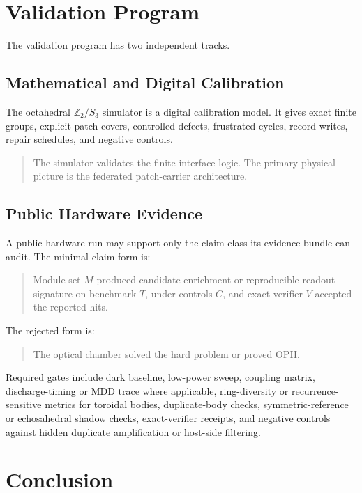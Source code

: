 \documentclass[11pt]{article}
\theoremstyle{remark}
\theoremstyle{plain}
\begin{document}
\section{Validation Program}

The validation program has two independent tracks.

\subsection{Mathematical and Digital Calibration}

The octahedral \(\mathbb Z_2/S_3\) simulator is a digital calibration model. It gives exact
finite groups, explicit patch covers, controlled defects, frustrated cycles, record writes,
repair schedules, and negative controls.
\begin{quote}
The simulator validates the finite interface logic. The primary physical picture is the
federated patch-carrier architecture.
\end{quote}

\subsection{Public Hardware Evidence}

A public hardware run may support only the claim class its evidence bundle can audit. The minimal
claim form is:
\begin{quote}
Module set \(M\) produced candidate enrichment or reproducible readout signature on benchmark
\(T\), under controls \(C\), and exact verifier \(V\) accepted the reported hits.
\end{quote}

The rejected form is:
\begin{quote}
The optical chamber solved the hard problem or proved OPH.
\end{quote}

Required gates include dark baseline, low-power sweep, coupling matrix, discharge-timing or MDD
trace where applicable, ring-diversity or recurrence-sensitive metrics for toroidal bodies,
duplicate-body checks, symmetric-reference or echosahedral shadow checks, exact-verifier receipts,
and negative controls against hidden duplicate amplification or host-side filtering.

\section{Conclusion}
\end{document}
